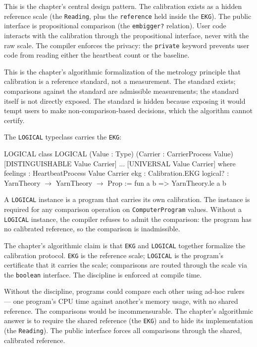 This is the chapter's central design pattern. The calibration
exists as a hidden reference scale (the \texttt{Reading}, plus
the \texttt{reference} held inside the \texttt{EKG}). The public
interface is propositional comparison (the \texttt{embigger?}
relation). User code interacts with the calibration through the
propositional interface, never with the raw scale. The compiler
enforces the privacy: the \texttt{private} keyword prevents user
code from reading either the heartbeat count or the baseline.

This is the chapter's algorithmic formalization of the metrology
principle that calibration is a reference standard, not a
measurement. The standard exists; comparisons against the standard
are admissible measurements; the standard itself is not directly
exposed. The standard is hidden because exposing it would tempt
users to make non-comparison-based decisions, which the algorithm
cannot certify.

The \texttt{LOGICAL} typeclass carries the \texttt{EKG}:

\begin{leanexcerpt}{LOGICAL}
class LOGICAL
    (Value : Type)
    (Carrier : CarrierProcess Value)
    [DISTINGUISHABLE Value Carrier] ... [UNIVERSAL Value Carrier]
  where
  feelings : HeartbeatProcess Value Carrier
  ekg      : Calibration.EKG
  logical? : YarnTheory $\to$ YarnTheory $\to$ Prop := fun a b =>
    YarnTheory.le a b
\end{leanexcerpt}

A \texttt{LOGICAL} instance is a program that carries its own
calibration. The instance is required for any comparison operation
on \texttt{ComputerProgram} values. Without a \texttt{LOGICAL}
instance, the compiler refuses to admit the comparison: the program
has no calibrated reference, so the comparison is inadmissible.

The chapter's algorithmic claim is that \texttt{EKG} and
\texttt{LOGICAL} together formalize the calibration protocol.
\texttt{EKG} is the reference scale; \texttt{LOGICAL} is the
program's certificate that it carries the scale; comparisons are
routed through the scale via the \texttt{boolean} interface. The
discipline is enforced at compile time.

Without the discipline, programs could compare each other using
ad-hoc rulers --- one program's CPU time against another's memory
usage, with no shared reference. The comparisons would be
incommensurable. The chapter's algorithmic answer is to require
the shared reference (the \texttt{EKG}) and to hide its
implementation (the \texttt{Reading}). The public interface
forces all comparisons through the shared, calibrated reference.

